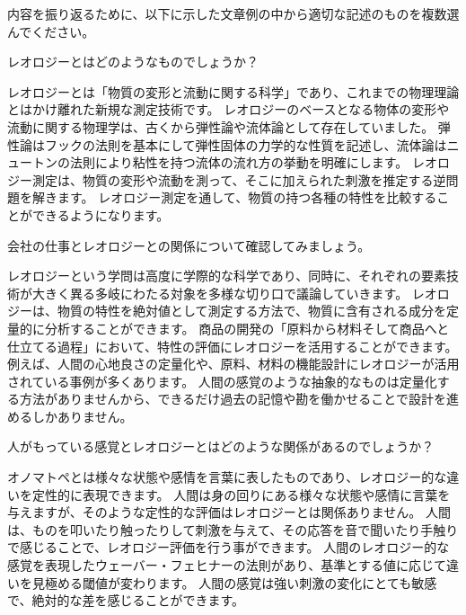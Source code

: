\documentclass[uplatex,dvipdfmx,a4paper,11pt]{jsarticle}
\begin{document}
内容を振り返るために、以下に示した文章例の中から適切な記述のものを複数選んでください。
\begin{qlist}
	\qitem レオロジーとはどのようなものでしょうか？
		\begin{qlist2}
			\qitem レオロジーとは「物質の変形と流動に関する科学」であり、これまでの物理理論とはかけ離れた新規な測定技術です。
			\qitem レオロジーのベースとなる物体の変形や流動に関する物理学は、古くから弾性論や流体論として存在していました。
			\qitem 弾性論はフックの法則を基本にして弾性固体の力学的な性質を記述し、流体論はニュートンの法則により粘性を持つ流体の流れ方の挙動を明確にします。
			\qitem レオロジー測定は、物質の変形や流動を測って、そこに加えられた刺激を推定する逆問題を解きます。
			\qitem レオロジー測定を通して、物質の持つ各種の特性を比較することができるようになります。
    \end{qlist2}
    \vspace{3mm}
	\qitem 会社の仕事とレオロジーとの関係について確認してみましょう。
		\begin{qlist2}
			\qitem レオロジーという学問は高度に学際的な科学であり、同時に、それぞれの要素技術が大きく異る多岐にわたる対象を多様な切り口で議論していきます。
			\qitem レオロジーは、物質の特性を絶対値として測定する方法で、物質に含有される成分を定量的に分析することができます。
			\qitem 商品の開発の「原料から材料そして商品へと仕立てる過程」において、特性の評価にレオロジーを活用することができます。
            \qitem 例えば、人間の心地良さの定量化や、原料、材料の機能設計にレオロジーが活用されている事例が多くあります。
            \qitem 人間の感覚のような抽象的なものは定量化する方法がありませんから、できるだけ過去の記憶や勘を働かせることで設計を進めるしかありません。
    \end{qlist2}
    \vspace{3mm}
	\qitem 人がもっている感覚とレオロジーとはどのような関係があるのでしょうか？
		\begin{qlist2}
            \qitem オノマトペとは様々な状態や感情を言葉に表したものであり、レオロジー的な違いを定性的に表現できます。
            \qitem 人間は身の回りにある様々な状態や感情に言葉を与えますが、そのような定性的な評価はレオロジーとは関係ありません。
			\qitem 人間は、ものを叩いたり触ったりして刺激を与えて、その応答を音で聞いたり手触りで感じることで、レオロジー評価を行う事ができます。
			\qitem 人間のレオロジー的な感覚を表現したウェーバー・フェヒナーの法則があり、基準とする値に応じて違いを見極める閾値が変わります。
            \qitem 人間の感覚は強い刺激の変化にとても敏感で、絶対的な差を感じることができます。

\end{qlist2}
\end{qlist}
\end{document}
